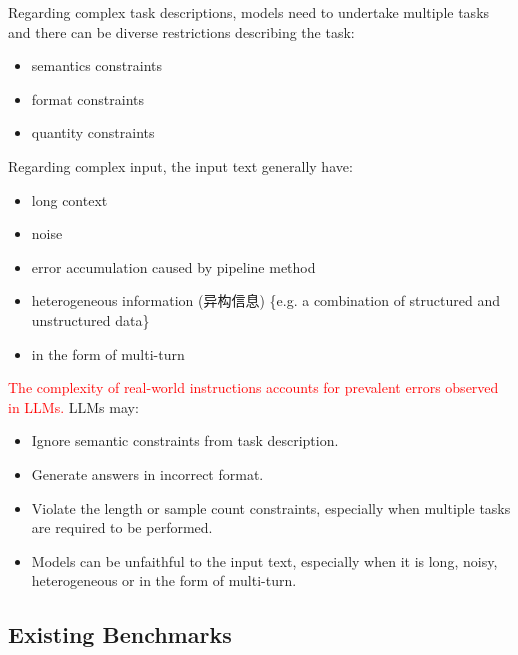 \documentclass{beamer}
\begin{document}
\begin{frame}
    Regarding complex task descriptions, models need to undertake multiple tasks and there can be diverse restrictions describing the task:
    \begin{itemize}
        \item {semantics constraints}
        \item {format constraints}
        \item {quantity constraints}
    \end{itemize}
    Regarding complex input, the input text generally have:
    \begin{itemize}
        \item {long context}
        \item {noise}
        \item {error accumulation caused by pipeline method}
        \item {heterogeneous information (异构信息) \{e.g. a combination of structured and unstructured data\}}
        \item {in the form of multi-turn}
    \end{itemize}
\end{frame}

\begin{frame}
    \textcolor{red}{The complexity of real-world instructions accounts for prevalent errors observed in LLMs.}
    \newline
    LLMs may:
    \begin{itemize}
        \item {Ignore semantic constraints from task description.}
        \item {Generate answers in incorrect format.}
        \item {Violate the length or sample count constraints, especially when multiple tasks are required to be performed.}
        \item {Models can be unfaithful to the input text, especially when it is long, noisy, heterogeneous or in the form of multi-turn.}
    \end{itemize}
\end{frame}

\subsection{Existing Benchmarks}
\end{document}
